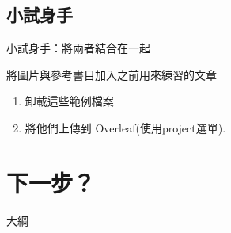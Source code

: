 \documentclass{beamer}
\begin{document}
\subsection{小試身手}
\begin{frame}[fragile]{小試身手：將兩者結合在一起}

將圖片與參考書目加入之前用來練習的文章

\begin{enumerate}
\item 卸載這些範例檔案

\begin{center}

\end{center}

\item 將他們上傳到 Overleaf(使用project選單).

\end{enumerate}
\end{frame}

\section{下一步？}

\begin{frame}{大綱}
\begin{multicols}{2}
\tableofcontents[currentsection]
\end{multicols}
\end{frame}

\end{document}

